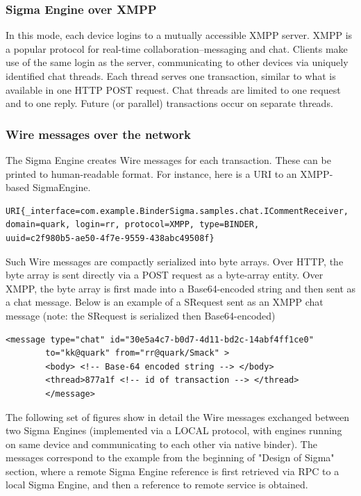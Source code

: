 \documentclass[prodmode]{acmlarge}
\begin{document}
\subsubsection{Sigma Engine over XMPP}
In this mode, each device logins to a mutually accessible XMPP server. XMPP is a popular protocol for real-time collaboration--messaging and chat. Clients make use of the same login as the server, communicating to other devices via uniquely identified chat threads. Each thread serves one transaction, similar to what is available in one HTTP POST request. Chat threads are limited to one request and to one reply. Future (or parallel) transactions occur on separate threads.

\subsubsection{Wire messages over the network}
The Sigma Engine creates Wire messages for each transaction. These can be printed to human-readable format. For instance, here is a URI to an XMPP-based SigmaEngine.
\begin{Verbatim}[samepage=true]
URI{_interface=com.example.BinderSigma.samples.chat.ICommentReceiver,
domain=quark, login=rr, protocol=XMPP, type=BINDER,
uuid=c2f980b5-ae50-4f7e-9559-438abc49508f}
\end{Verbatim}

Such Wire messages are compactly serialized into byte arrays. Over HTTP, the byte array is sent directly via a POST request as a byte-array entity. Over XMPP, the byte array is first made into a Base64-encoded string and then sent as a chat message. Below is an example of a SRequest sent as an XMPP chat message (note: the SRequest is serialized then Base64-encoded)
\begin{Verbatim}[samepage=true]
<message type="chat" id="30e5a4c7-b0d7-4d11-bd2c-14abf4ff1ce0"
        to="kk@quark" from="rr@quark/Smack" >
        <body> <!-- Base-64 encoded string --> </body>
        <thread>877a1f <!-- id of transaction --> </thread>
        </message>
\end{Verbatim}

The following set of figures show in detail the Wire messages exchanged between two Sigma Engines (implemented via a LOCAL protocol, with engines running on same device and communicating to each other via native binder). The messages correspond to the example from the beginning of "Design of Sigma" section, where a remote Sigma Engine reference is first retrieved via RPC to a local Sigma Engine, and then a reference to remote service is obtained.
\end{document}
